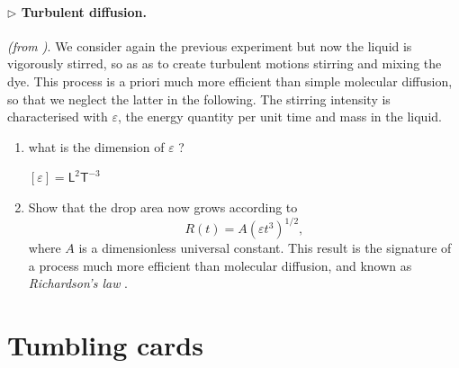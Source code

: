 \documentclass[11pt,a4paper]{article}
\newcommand{\lp}{\left(}
\newcommand{\rp}{\right)}
\begin{document}
\paragraph{$\rhd$ Turbulent diffusion.} \textit{(from \citet{Eggers2015})}. We consider again the previous experiment but now the liquid is vigorously stirred, so as as to create turbulent motions stirring and mixing the dye. This process is a priori much more efficient than simple molecular diffusion, so that we neglect the latter in the following. The stirring intensity is characterised with $\varepsilon$, the energy quantity per unit time and mass in the liquid. 
\begin{enumerate}[resume]
\item what is the dimension of $\varepsilon$ ?
\begin{answer}
$[\varepsilon] = \mathsf{L}^2\mathsf{T}^{-3}$
\end{answer}

\item Show that the drop area now grows according to
\begin{equation}
R(t) = A \lp \varepsilon t^3\rp^{1/2},
\end{equation}
where $A$ is a dimensionless universal constant. This result is the signature of a process much more efficient than molecular diffusion, and known as \textit{Richardson's law} \citep{Richardson1926,Eggers2015}.
\end{enumerate}

\section{Tumbling cards}
\end{document}

